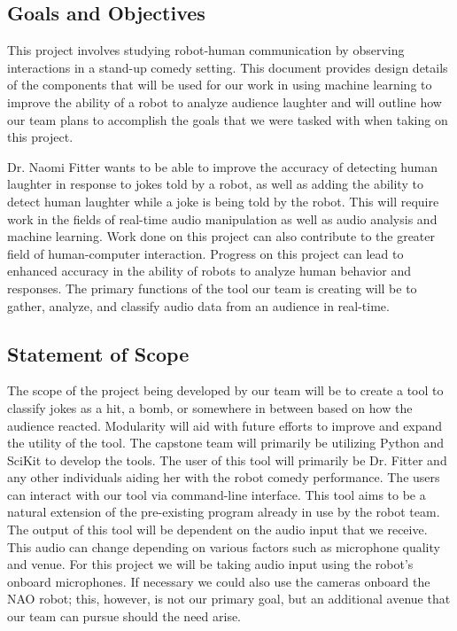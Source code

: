 \documentclass[onecolumn, draftclsnofoot,10pt, compsoc]{IEEEtran}
\begin{document}
\subsection{Goals and Objectives}
This project involves studying robot-human communication by observing interactions in a stand-up comedy setting. This document provides design details of the components that will be used for our work in using machine learning to improve the ability of a robot to analyze audience laughter and will outline how our team plans to accomplish the goals that we were tasked with when taking on this project.\par
\vspace{.3cm}
\noindent Dr. Naomi Fitter wants to be able to improve the accuracy of detecting human laughter in response to jokes told by a robot, as well as adding the ability to detect human laughter while a joke is being told by the robot. This will require work in the fields of real-time audio manipulation as well as audio analysis and machine learning. Work done on this project can also contribute to the greater field of human-computer interaction. Progress on this project can lead to enhanced accuracy in the ability of robots to analyze human behavior and responses. The primary functions of the tool our team is creating will be to gather, analyze, and classify audio data from an audience in real-time.\par
\subsection{Statement of Scope}
The scope of the project being developed by our team will be to create a tool to classify jokes as a hit, a bomb, or somewhere in between based on how the audience reacted. Modularity will aid with future efforts to improve and expand the utility of the tool. The capstone team will primarily be utilizing Python and SciKit to develop the tools. The user of this tool will primarily be Dr. Fitter and any other individuals aiding her with the robot comedy performance. The users can interact with our tool via command-line interface. This tool aims to be a natural extension of the pre-existing program already in use by the robot team. The output of this tool will be dependent on the audio input that we receive. This audio can change depending on various factors such as microphone quality and venue. For this project we will be taking audio input using the robot's onboard microphones. If necessary we could also use the cameras onboard the NAO robot; this, however, is not our primary goal, but an additional avenue that our team can pursue should the need arise.
\end{document}
